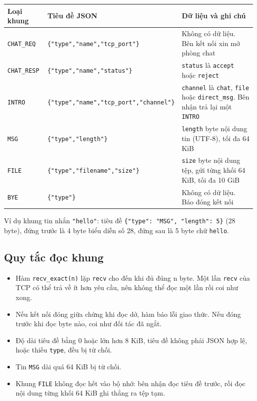 \documentclass[a4paper,12pt]{article}
\newcommand{\code}[1]{\texttt{#1}}
\begin{document}
\begin{center}
\small
\begin{tabularx}{\textwidth}{@{}l >{\raggedright\arraybackslash}p{5.8cm} X@{}}
\toprule
\textbf{Loại khung} & \textbf{Tiêu đề JSON} & \textbf{Dữ liệu và ghi chú} \\
\midrule
\code{CHAT\_REQ} & \code{\{"type","name","tcp\_port"\}} & Không có dữ liệu. Bên kết nối xin mở phòng chat \\
\code{CHAT\_RESP} & \code{\{"type","name","status"\}} & \code{status} là \code{accept} hoặc \code{reject} \\
\code{INTRO} & \code{\{"type","name","tcp\_port",\allowbreak"channel"\}} & \code{channel} là \code{chat}, \code{file} hoặc \code{direct\_msg}. Bên nhận trả lại một \code{INTRO} \\
\code{MSG} & \code{\{"type","length"\}} & \code{length} byte nội dung tin (UTF-8), tối đa 64 KiB \\
\code{FILE} & \code{\{"type","filename","size"\}} & \code{size} byte nội dung tệp, gửi từng khối 64 KiB, tối đa 10 GiB \\
\code{BYE} & \code{\{"type"\}} & Không có dữ liệu. Báo đóng kết nối \\
\bottomrule
\end{tabularx}
\end{center}

Ví dụ khung tin nhắn \code{"hello"}: tiêu đề \code{\{"type": "MSG", "length": 5\}} (28 byte), đứng trước là 4 byte biểu diễn số 28, đứng sau là 5 byte chữ \code{hello}.

\subsection{Quy tắc đọc khung}
\begin{itemize}
\item Hàm \code{recv\_exact(n)} lặp \code{recv} cho đến khi đủ đúng n byte. Một lần \code{recv} của TCP có thể trả về ít hơn yêu cầu, nên không thể đọc một lần rồi coi như xong.
\item Nếu kết nối đóng giữa chừng khi đọc dở, hàm báo lỗi giao thức. Nếu đóng trước khi đọc byte nào, coi như đối tác đã ngắt.
\item Độ dài tiêu đề bằng 0 hoặc lớn hơn 8 KiB, tiêu đề không phải JSON hợp lệ, hoặc thiếu \code{type}, đều bị từ chối.
\item Tin \code{MSG} dài quá 64 KiB bị từ chối.
\item Khung \code{FILE} không đọc hết vào bộ nhớ: bên nhận đọc tiêu đề trước, rồi đọc nội dung từng khối 64 KiB ghi thẳng ra tệp tạm.
\end{itemize}
\end{document}
